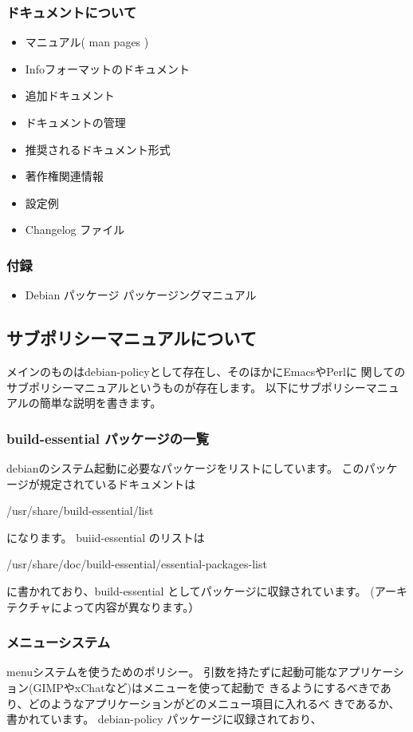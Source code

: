 \documentclass[mingoth,a4paper]{jsarticle}
\begin{document}
    \subsubsection{ドキュメントについて}
\begin{itemize}
        \item マニュアル( man pages )
        \item Infoフォーマットのドキュメント
        \item 追加ドキュメント
        \item ドキュメントの管理
        \item 推奨されるドキュメント形式
        \item 著作権関連情報
        \item 設定例
        \item Changelog ファイル
\end{itemize}
    \subsubsection{付録}
\begin{itemize}
        \item Debian パッケージ パッケージングマニュアル
\end{itemize}

\subsection{サブポリシーマニュアルについて}
    メインのものはdebian-policyとして存在し、そのほかにEmacsやPerlに
    関してのサブポリシーマニュアルというものが存在します。
    以下にサブポリシーマニュアルの簡単な説明を書きます。

    \subsubsection{build-essential パッケージの一覧}
        debianのシステム起動に必要なパッケージをリストにしています。
        このパッケージが規定されているドキュメントは

        /usr/share/build-essential/list
 
        になります。
        buiid-essential のリストは

        /usr/share/doc/build-essential/essential-packages-list

        に書かれており、build-essential としてパッケージに収録されています。
        (アーキテクチャによって内容が異なります。）

    \subsubsection{メニューシステム}
        menuシステムを使うためのポリシー。
        引数を持たずに起動可能なアプリケーション(GIMPやxChatなど)はメニューを使って起動で
        きるようにするべきであり、どのようなアプリケーションがどのメニュー項目に入れるべ
        きであるか、書かれています。
        debian-policy パッケージに収録されており、
\end{document}
